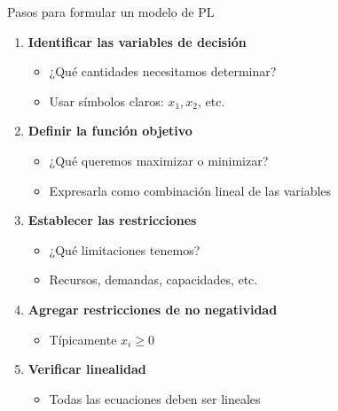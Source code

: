 \documentclass[aspectratio=169,10pt]{beamer}
\begin{document}
\begin{frame}{Pasos para formular un modelo de PL}

\begin{enumerate}
    \item \textbf{Identificar las variables de decisión}
    \begin{itemize}
        \item ¿Qué cantidades necesitamos determinar?
        \item Usar símbolos claros: $x_1, x_2$, etc.
    \end{itemize}

    \vspace{0.2cm}

    \item \textbf{Definir la función objetivo}
    \begin{itemize}
        \item ¿Qué queremos maximizar o minimizar?
        \item Expresarla como combinación lineal de las variables
    \end{itemize}

    \vspace{0.2cm}

    \item \textbf{Establecer las restricciones}
    \begin{itemize}
        \item ¿Qué limitaciones tenemos?
        \item Recursos, demandas, capacidades, etc.
    \end{itemize}

    \vspace{0.2cm}

    \item \textbf{Agregar restricciones de no negatividad}
    \begin{itemize}
        \item Típicamente $x_i \geq 0$
    \end{itemize}

    \vspace{0.2cm}

    \item \textbf{Verificar linealidad}
    \begin{itemize}
        \item Todas las ecuaciones deben ser lineales
    \end{itemize}
\end{enumerate}

\end{frame}
\end{document}
